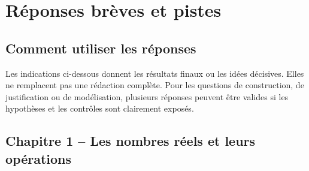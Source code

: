 \ifcorrige
\appendix
\part*{Réponses brèves et pistes}
\chapter*{Comment utiliser les réponses}
Les indications ci-dessous donnent les résultats finaux ou les idées décisives. Elles ne remplacent pas une rédaction complète. Pour les questions de construction, de justification ou de modélisation, plusieurs réponses peuvent être valides si les hypothèses et les contrôles sont clairement exposés.
\chapter*{Chapitre 1 -- Les nombres réels et leurs opérations}
